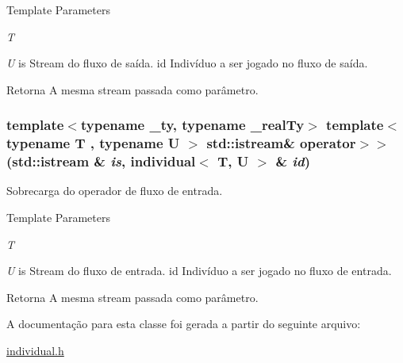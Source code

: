 \begin{DoxyTemplParams}{Template Parameters}
\item[{\em T}]\item[{\em U}]is Stream do fluxo de saída.  id Indivíduo a ser jogado no fluxo de saída.\end{DoxyTemplParams}
\begin{DoxyReturn}{Retorna}
A mesma stream passada como parâmetro. 
\end{DoxyReturn}
\hypertarget{classindividual_a11c97e7fa3954c61cc91282d96d1ae2d}{
\subsubsection[{operator$>$$>$}]{\setlength{\rightskip}{0pt plus 5cm}template$<$typename \_\-ty, typename \_\-realTy$>$ template$<$typename T , typename U $>$ std::istream\& operator$>$$>$ (std::istream \& {\em is}, \/  {\bf individual}$<$ T, U $>$ \& {\em id})}}
\label{classindividual_a11c97e7fa3954c61cc91282d96d1ae2d}
Sobrecarga do operador de fluxo de entrada.


\begin{DoxyTemplParams}{Template Parameters}
\item[{\em T}]\item[{\em U}]is Stream do fluxo de entrada.  id Indivíduo a ser jogado no fluxo de entrada.\end{DoxyTemplParams}
\begin{DoxyReturn}{Retorna}
A mesma stream passada como parâmetro. 
\end{DoxyReturn}


A documentação para esta classe foi gerada a partir do seguinte arquivo:\begin{DoxyCompactItemize}
\item 
\hyperlink{individual_8h}{individual.h}\end{DoxyCompactItemize}
